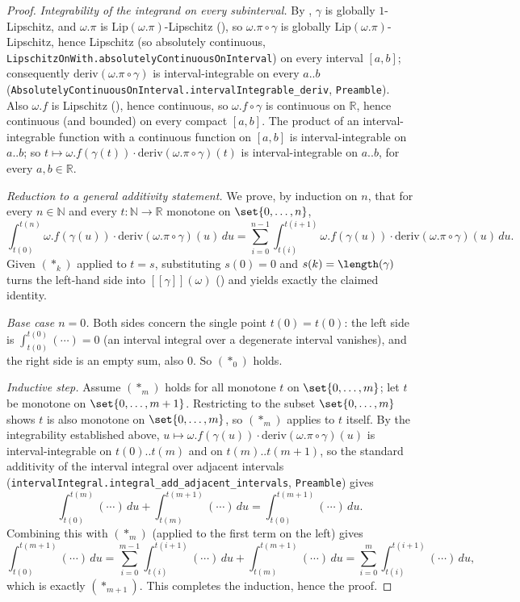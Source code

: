 \begin{proof}
  \emph{Integrability of the integrand on every subinterval.} By , $\gamma$
  is globally $1$-Lipschitz, and $\omega.\pi$ is $\mathrm{Lip}(\omega.\pi)$-Lipschitz
  (), so $\omega.\pi\circ\gamma$ is globally $\mathrm{Lip}(\omega.\pi)$-Lipschitz,
  hence Lipschitz (so absolutely continuous, \texttt{LipschitzOnWith.absolutelyContinuousOnInterval})
  on every interval $[a,b]$; consequently $\mathrm{deriv}(\omega.\pi\circ\gamma)$ is interval-integrable on
  every $a..b$ (\texttt{AbsolutelyContinuousOnInterval.intervalIntegrable\_deriv}, \texttt{Preamble}).
  Also $\omega.f$ is Lipschitz (), hence continuous, so $\omega.f\circ\gamma$ is
  continuous on $\mathbb{R}$, hence continuous (and bounded) on every compact $[a,b]$. The product
  of an interval-integrable function with a continuous function on $[a,b]$ is interval-integrable
  on $a..b$; so $t \mapsto \omega.f(\gamma(t))\cdot\mathrm{deriv}(\omega.\pi\circ\gamma)(t)$ is
  interval-integrable on $a..b$, for every $a,b \in \mathbb{R}$.

  \emph{Reduction to a general additivity statement.} We prove, by induction on $n$, that for every
  $n \in \mathbb{N}$ and every $t \colon \mathbb{N} \to \mathbb{R}$ monotone on $\set{0,\dots,n}$,
  \[
    \int_{t(0)}^{t(n)} \omega.f(\gamma(u)) \cdot \mathrm{deriv}(\omega.\pi\circ\gamma)(u)\,du
    = \sum_{i=0}^{n-1} \int_{t(i)}^{t(i+1)} \omega.f(\gamma(u)) \cdot \mathrm{deriv}(\omega.\pi\circ\gamma)(u)\,du
    . \tag{$\ast_n$}
  \]
  Given $(\ast_k)$ applied to $t=s$, substituting $s(0)=0$ and $s(k)=\length(\gamma)$ turns the
  left-hand side into $[[\gamma]](\omega)$ () and yields exactly the claimed
  identity.

  \emph{Base case $n=0$.} Both sides concern the single point $t(0)=t(0)$: the left side is
  $\int_{t(0)}^{t(0)} (\cdots) = 0$ (an interval integral over a degenerate interval vanishes), and
  the right side is an empty sum, also $0$. So $(\ast_0)$ holds.

  \emph{Inductive step.} Assume $(\ast_m)$ holds for all monotone $t$ on $\set{0,\dots,m}$; let $t$
  be monotone on $\set{0,\dots,m+1}$. Restricting to the subset $\set{0,\dots,m}$ shows $t$ is also
  monotone on $\set{0,\dots,m}$, so $(\ast_m)$ applies to $t$ itself. By the integrability
  established above, $u \mapsto \omega.f(\gamma(u))\cdot\mathrm{deriv}(\omega.\pi\circ\gamma)(u)$ is
  interval-integrable on $t(0)..t(m)$ and on $t(m)..t(m+1)$, so the standard additivity of the
  interval integral over adjacent intervals
  (\texttt{intervalIntegral.integral\_add\_adjacent\_intervals}, \texttt{Preamble}) gives
  \[
    \int_{t(0)}^{t(m)} (\cdots)\,du + \int_{t(m)}^{t(m+1)} (\cdots)\,du
    = \int_{t(0)}^{t(m+1)} (\cdots)\,du
    .
  \]
  Combining this with $(\ast_m)$ (applied to the first term on the left) gives
  \[
    \int_{t(0)}^{t(m+1)} (\cdots)\,du
    = \sum_{i=0}^{m-1} \int_{t(i)}^{t(i+1)} (\cdots)\,du + \int_{t(m)}^{t(m+1)} (\cdots)\,du
    = \sum_{i=0}^{m} \int_{t(i)}^{t(i+1)} (\cdots)\,du
    ,
  \]
  which is exactly $(\ast_{m+1})$. This completes the induction, hence the proof.
\end{proof}
